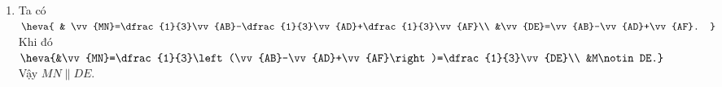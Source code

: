 \begin{bt}
{\begin{enumerate}
			Khi đó
			\begin{align*}
				\vv{DE}&\ = \vv{DB}+\vv{BE}\\
				&\ = \vv{DA}+\vv{DC}+\vv{AF}\\
				&\ = -\vv{AD}+\vv{AB}+\vv{AF}.
			\end{align*}
			\item  Ta có $\heva{
				& \vv{MN}=\dfrac{1}{3}\vv{AB}-\dfrac{1}{3}\vv{AD}+\dfrac{1}{3}\vv{AF}\\
				&\vv{DE}=\vv{AB}-\vv{AD}+\vv{AF}.
			}$\\
			Khi đó $\heva{&\vv{MN}=\dfrac{1}{3}\left(\vv{AB}-\vv{AD}+\vv{AF}\right)=\dfrac{1}{3}\vv{DE}\\
				&M\notin DE.}$\\
			Vậy $MN\parallel DE$.
		\end{enumerate}
	}
\end{bt}

